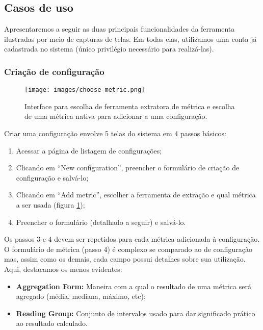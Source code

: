 \documentclass[12pt]{article}
\begin{document}
  \subsection{Casos de uso}
  Apresentaremos a seguir as duas principais funcionalidades da ferramenta ilustradas por meio de capturas de telas. Em todas elas, utilizamos uma conta já cadastrada no sistema (único privilégio necessário para realizá-las).

    \subsubsection{Criação de configuração}
    \begin{figure}[H]
      \centering
      \texttt{[image: images/choose-metric.png]}
      \caption{Interface para escolha de ferramenta extratora de métrica e escolha de uma métrica nativa para adicionar a uma configuração.}
      \label{fig:choose-metric}
    \end{figure}

    Criar uma configuração envolve 5 telas do sistema em 4 passos básicos:
    \begin{enumerate}
      \item Acessar a página de listagem de configurações;
      \item Clicando em ``New configuration'', preencher o formulário de criação de configuração e salvá-lo;
      \item Clicando em ``Add metric'', escolher a ferramenta de extração e qual métrica a ser usada (figura \ref{fig:choose-metric});
      \item Preencher o formulário (detalhado a seguir) e salvá-lo.
    \end{enumerate}

    Os passos 3 e 4 devem ser repetidos para cada métrica adicionada à configuração. O formulário de métrica (passo 4) é complexo se comparado ao de configuração mas, assim como os demais, cada campo possui detalhes sobre sua utilização. Aqui, destacamos os menos evidentes:
    \begin{itemize}
      \item \textbf{Aggregation Form:} Maneira com a qual o resultado de uma métrica será agregado (média, mediana, máximo, etc);
      \item \textbf{Reading Group:} Conjunto de intervalos usado para dar significado prático ao resultado calculado.
    \end{itemize}
\end{document}

